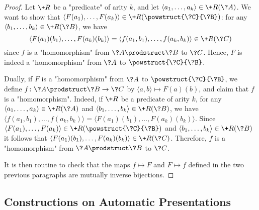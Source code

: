 \begin{proof}
Let $\+R$ be a "predicate" of arity $k$, and let
$\langle a_1,\dotsc,a_k \rangle \in \+R(\?A)$.
We want to show that $\langle F(a_1),\dotsc,F(a_k) \rangle \in \+R(\powstruct{\?C}{\?B})$:
for any $\langle b_1,\dotsc,b_k \rangle \in \+R(\?B)$, we have
\[\langle F(a_1)(b_1), \dotsc, F(a_k)(b_k)\rangle = \langle f(a_1,b_1),\dotsc,f(a_k,b_k) \rangle \in \+R(\?C)\] since $f$ is a "homomorphism" from $\?A\prodstruct \?B$ to $\?C$.
Hence, $F$ is indeed a "homomorphism" from $\?A$ to $\powstruct{\?C}{\?B}$.

Dually, if $F$ is a "homomorphism" from $\?A$ to $\powstruct{\?C}{\?B}$,
we define $f\colon \?A\prodstruct \?B \to \?C$ by $\langle a,b \rangle \mapsto F(a)(b)$,
and claim that $f$ is a "homomorphism". Indeed, if $\+R$ be a predicate of arity $k$,
for any $\langle a_1, \dotsc, a_k \rangle \in \+R(\?A)$
and $\langle b_1, \dotsc, b_k \rangle \in \+R(\?B)$,
we have $\langle f(a_1,b_1), \dotsc, f(a_k,b_k) \rangle
= \langle F(a_1)(b_1), \dotsc, F(a_k)(b_k) \rangle$.
Since $\langle F(a_1), \dotsc, F(a_k) \rangle \in \+R(\powstruct{\?C}{\?B})$
and $\langle b_1, \dotsc,b_k \rangle \in \+R(\?B)$ 
it follows that $\langle F(a_1)(b_1), \dotsc, F(a_k)(b_k) \rangle \in \+R(\?C)$.
Therefore, $f$ is a "homomorphism" from $\?A \prodstruct \?B$ to $\?C$.

It is then routine to check that the maps $f \mapsto F$ and $F \mapsto f$ defined
in the two previous paragraphs are mutually inverse bijections.
\end{proof}

\subsection{Constructions on Automatic Presentations}
\label{sec:construction-automatic-presentations}

